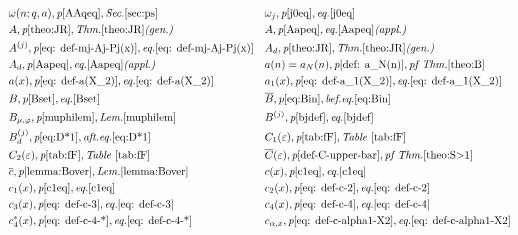 \documentclass[12pt]{amsart}
\begin{document}
{\begin{align*}
    &\omega(n;q,a),\textit{p}\pageref{AAqeq},\textit{Sec.} \ref{sec:ps}&
    &\omega_j,\textit{p}\pageref{j0eq},\textit{eq.}\eqref{j0eq}\\
    &A,\textit{p}\pageref{theo:JR},\textit{Thm.}\ref{theo:JR} \textit{(gen.)} &
    &A,\textit{p}\pageref{Aapeq},\textit{eq.}\eqref{Aapeq} \textit{(appl.)}\\
    &A^{(j)},\textit{p}\pageref{eq: def-mj-Aj-Pj(x)},\textit{eq.}\eqref{eq: def-mj-Aj-Pj(x)}&
    &A_d,\textit{p}\pageref{theo:JR},\textit{Thm.}\ref{theo:JR} \textit{(gen.)} \\
    &A_d,\textit{p}\pageref{Aapeq},\textit{eq.}\eqref{Aapeq} \textit{(appl.)}&
    &a(n)=a_N(n), \textit{p}\pageref{def: a_N(n)},\textit{pf Thm.}\ref{theo:B}\\
    &a(x),\textit{p}\pageref{eq: def-a(X_2)},\textit{eq.}\eqref{eq: def-a(X_2)} &
    &a_1(x),\textit{p}\pageref{eq: def-a_1(X_2)},\textit{eq.}\eqref{eq: def-a_1(X_2)}\\
    &B,\textit{p}\pageref{Bset},\textit{eq.}\eqref{Bset}&
    &\overline{B},\textit{p}\pageref{eq:Bin},\textit{bef.eq.}\eqref{eq:Bin}\\
    &B_{\mu, \varphi}, \textit{p}\pageref{muphilem},\textit{Lem.}\ref{muphilem}&
    &B^{(j)},\textit{p}\pageref{bjdef},\textit{eq.}\eqref{bjdef}\\
    &B_d^{(j)},\textit{p}\pageref{eq:D*1},\textit{aft.eq.}\eqref{eq:D*1}&
    &C_1(\varepsilon),\textit{p}\pageref{tab:fF}, \textit{Table } \ref{tab:fF}\\
    &C_2(\varepsilon),\textit{p}\pageref{tab:fF}, \textit{Table } \ref{tab:fF}&
    &\overline{C}(\varepsilon),\textit{p}\pageref{def-C-upper-bar},\textit{pf Thm.}\ref{theo:S>1}\\
    &\overline{c},\textit{p}\pageref{lemma:Bover},\textit{Lem.}\ref{lemma:Bover}&
    &c(x),\textit{p}\pageref{c1eq},\textit{eq.}\eqref{c1eq}\\
    &c_1(x),\textit{p}\pageref{c1eq},\textit{eq.}\eqref{c1eq}&
    &c_2(x),\textit{p}\pageref{eq: def-c-2},\textit{eq.}\eqref{eq: def-c-2}\\
    &c_3(x),\textit{p}\pageref{eq: def-c-3},\textit{eq.}\eqref{eq: def-c-3}&
    &c_4(x),\textit{p}\pageref{eq: def-c-4},\textit{eq.}\eqref{eq: def-c-4}\\
    &c_4^*(x),\textit{p}\pageref{eq: def-c-4-*},\textit{eq.}\eqref{eq: def-c-4-*}&
    &c_{\alpha,x},\textit{p}\pageref{eq: def-c-alpha1-X2},\textit{eq.}\eqref{eq: def-c-alpha1-X2}\\

\end{align*}}
\end{document}
